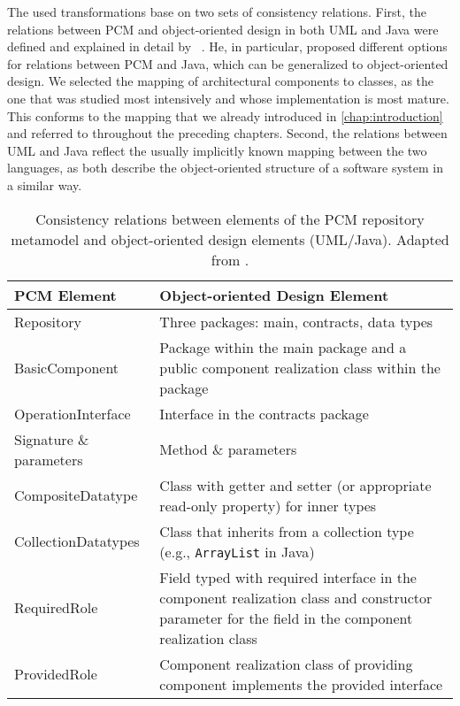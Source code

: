 The used transformations base on two sets of consistency relations.
First, the relations between \gls{PCM} and object-oriented design in both \gls{UML} and Java were defined and explained in detail by \citeauthor{langhammer2017a}~\cite{langhammer2015a, langhammer2017a}.
He, in particular, proposed different options for relations between \gls{PCM} and Java, which can be generalized to object-oriented design.
We selected the mapping of architectural components to classes, as the one that was studied most intensively and whose implementation is most mature.
This conforms to the mapping that we already introduced in \autoref{chap:introduction} and referred to throughout the preceding chapters.
Second, the relations between \gls{UML} and Java reflect the usually implicitly known mapping between the two languages, as both describe the object-oriented structure of a software system in a similar way.

\begin{table}
	\centering 
    \small
    \renewcommand{\arraystretch}{1.4}
	\begin{tabular}{p{3.2cm} p{6.6cm}}
		\toprule
        \textbf{\gls{PCM} Element}  & \textbf{Object-oriented Design Element} \\
        \midrule
		Repository              & Three packages: main, contracts, data types\\
		BasicComponent 		    & Package within the main package and a public component realization class within the package \\
		OperationInterface		& Interface in the contracts package \\
		Signature \& parameters & Method \& parameters \\
		CompositeDatatype       & Class with getter and setter (or appropriate read-only property) for inner types\\
		CollectionDatatypes     & Class that inherits from a collection type (e.g., \texttt{ArrayList} in Java) \\
		RequiredRole		    & Field typed with required interface in the component realization class and constructor parameter for the field in the component realization class\\
		ProvidedRole		    & Component realization class of providing component implements the provided interface\\
		\bottomrule
	\end{tabular}
	\caption[Consistency relations between PCM and UML/Java]{Consistency relations between elements of the \gls{PCM} repository metamodel and object-oriented design elements (\gls{UML}/Java). Adapted from \cite[Table 4.1]{langhammer2017a}.}
	\label{tab:correctness_evaluation:errors:pcm_oo_rules}
\end{table}

